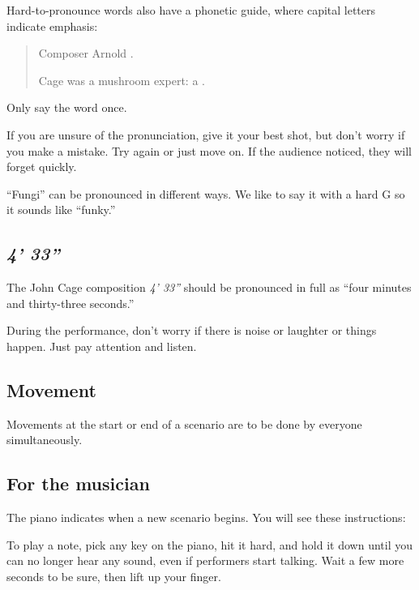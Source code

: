 Hard-to-pronounce words also have a phonetic guide, where capital letters indicate emphasis:

\begin{quote}

  Composer Arnold .

  Cage was a mushroom expert: a .

\end{quote}

Only say the word once.

If you are unsure of the pronunciation, give it your best shot, but don't worry if you make a mistake.  Try again or just move on.  If the audience noticed, they will forget quickly.

``Fungi'' can be pronounced in different ways.  We like to say it with a hard G so it sounds like ``funky.''

\subsection*{\textit{4' 33''}}

The John Cage composition \textit{4' 33''} should be pronounced in full as ``four minutes and thirty-three seconds.''

During the performance, don't worry if there is noise or laughter or things happen.  Just pay attention and listen.

\subsection*{Movement}

Movements at the start or end of a scenario are to be done by everyone simultaneously.

\subsection*{For the musician}

The piano indicates when a new scenario begins.  You will see these instructions:


To play a note, pick any key on the piano, hit it hard, and hold it down until you can no longer hear any sound, even if performers start talking.  Wait a few more seconds to be sure, then lift up your finger.

\newpageforperformers{}

